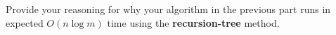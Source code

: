 \begin{parts}
\begin{subparts}
    \begin{solution}
    \vspace{2.5in}
    \end{solution}

    \newpage

    \begin{solution}
    \vspace{4.5in}
    \end{solution}    
    
    \subpart[2] Provide your reasoning for why your algorithm in the previous part runs in expected $O(n\log m)$ time using the \textbf{recursion-tree} method.
    \begin{solution}
    \vspace{3in}
    \end{solution}
    
\end{subparts}

\end{parts}